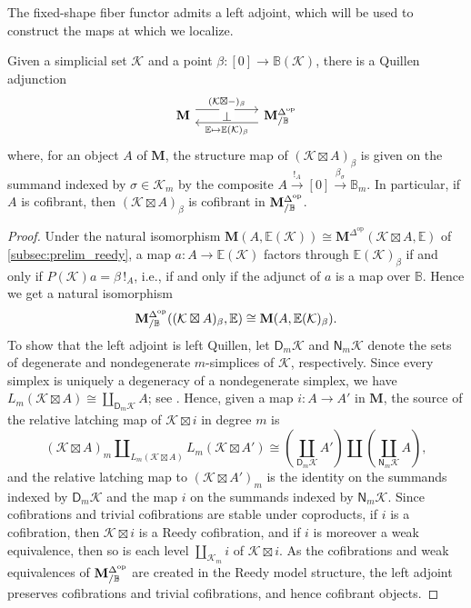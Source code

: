 \documentclass[10pt,reqno]{amsart}
\begin{document}
The fixed-shape fiber functor admits a left adjoint, which will be
used to construct the maps at which we localize.
\begin{lemma}
\label{lem:general_shape_quillen}
Given a simplicial set $\mathcal K$ and a point
$\beta:[0]\to\mathbb B(\mathcal K)$, there is a Quillen adjunction
\[
\adjunction{\mathbf M}{\genreedyslice}
  {(\mathcal K\boxtimes-)_{\beta}}
  {\mathbb E\mapsto\mathbb E(\mathcal K)_\beta}
\]
where, for an object $A$ of $\mathbf M$, the structure map of
$(\mathcal K\boxtimes A)_\beta$ is given on the summand indexed by
$\sigma\in\mathcal K_m$ by the composite
$A\xrightarrow{!_A}[0]\xrightarrow{\beta_\sigma}\mathbb B_m$. In
particular, if $A$ is cofibrant, then
$(\mathcal K\boxtimes A)_\beta$ is cofibrant in $\mathbf M^{\Delta^{\mathrm{op}}}_{/\mathbb B}$.
\end{lemma}
\begin{proof}
Under the natural isomorphism
$\mathbf M(A,\mathbb E(\mathcal K))\cong
\mathbf M^{\Delta^{\mathrm{op}}}(\mathcal K\boxtimes A,\mathbb E)$
of \cref{subsec:prelim_reedy}, a map $a:A\to\mathbb E(\mathcal K)$
factors through $\mathbb E(\mathcal K)_\beta$ if and only if
$P(\mathcal K)a=\beta\,!_A$, i.e., if and only if the adjunct of
$a$ is a map over $\mathbb B$. Hence we get a natural isomorphism
\[
\mathbf M^{\Delta^{\mathrm{op}}}_{/\mathbb B}((\mathcal K\boxtimes A)_\beta,\mathbb E)
\cong\mathbf M(A,\mathbb E(\mathcal K)_\beta).
\]
To show that the left adjoint is left Quillen, let
$\mathsf D_m\mathcal K$ and $\mathsf N_m\mathcal K$ denote the sets
of degenerate and nondegenerate $m$-simplices of $\mathcal K$,
respectively. Since every simplex is uniquely a degeneracy of a
nondegenerate simplex, we have
$L_m(\mathcal K\boxtimes A)\cong\coprod_{\mathsf D_m\mathcal K}A$;
see \cite[Lemma~15.8.4]{hirschhorn2003model}. Hence, given a map
$i:A\to A'$ in $\mathbf M$, the source of the relative latching map
of $\mathcal K\boxtimes i$ in degree $m$ is
\[
(\mathcal K\boxtimes A)_m
  \amalg_{L_m(\mathcal K\boxtimes A)}L_m(\mathcal K\boxtimes A')
\cong
\left(\coprod_{\mathsf D_m\mathcal K}A'\right)
  \amalg\left(\coprod_{\mathsf N_m\mathcal K}A\right),
\]
and the relative latching map to $(\mathcal K\boxtimes A')_m$ is the
identity on the summands indexed by $\mathsf D_m\mathcal K$ and the
map $i$ on the summands indexed by $\mathsf N_m\mathcal K$. Since
cofibrations and trivial cofibrations are stable under coproducts, if
$i$ is a cofibration, then $\mathcal K\boxtimes i$ is a Reedy
cofibration, and if $i$ is moreover a weak equivalence, then so is
each level $\coprod_{\mathcal K_m}i$ of $\mathcal K\boxtimes i$.
As the cofibrations and weak equivalences of $\mathbf M^{\Delta^{\mathrm{op}}}_{/\mathbb B}$ are
created in the Reedy model structure, the left adjoint preserves
cofibrations and trivial cofibrations, and hence cofibrant objects.
\end{proof}
\end{document}
